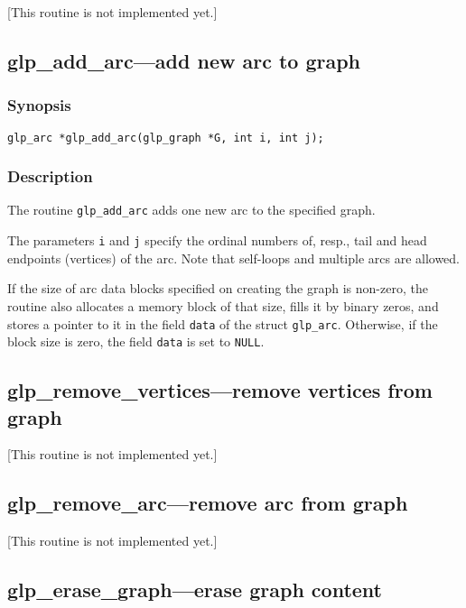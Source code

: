 [This routine is not implemented yet.]

\subsection{glp\_add\_arc---add new arc to graph}

\subsubsection*{Synopsis}

\begin{verbatim}
glp_arc *glp_add_arc(glp_graph *G, int i, int j);
\end{verbatim}

\subsubsection*{Description}

The routine \verb|glp_add_arc| adds one new arc to the specified graph.

The parameters \verb|i| and \verb|j| specify the ordinal numbers of,
resp., tail and head endpoints (vertices) of the arc. Note that
self-loops and multiple arcs are allowed.

If the size of arc data blocks specified on creating the graph is
non-zero, the routine also allocates a memory block of that size, fills
it by binary zeros, and stores a pointer to it in the field \verb|data|
of the struct \verb|glp_arc|. Otherwise, if the block size is zero, the
field \verb|data| is set to \verb|NULL|.

\subsection{glp\_remove\_vertices---remove vertices from graph}

[This routine is not implemented yet.]

\subsection{glp\_remove\_arc---remove arc from graph}

[This routine is not implemented yet.]

\subsection{glp\_erase\_graph---erase graph content}

